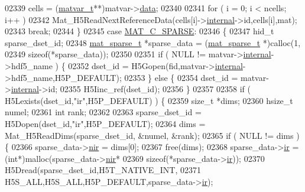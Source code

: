 \begin{DoxyCode}
{{{{{{{{{{02339             cells  = (\hyperlink{group___m_a_t_structmatvar__t}{matvar\_t}**)matvar->\hyperlink{group___m_a_t_a5672978efa230bbdecdf38ede781f7fa}{data};
02340 
02341             for ( i = 0; i < ncells; i++ )
02342                 Mat\_H5ReadNextReferenceData(cells[i]->\hyperlink{namespaceinternal}{internal}->id,cells[i],mat);
02343             \textcolor{keywordflow}{break};
02344         \}
02345         \textcolor{keywordflow}{case} \hyperlink{group___m_a_t_ggad4d60ae7b709fc81bfd744fb4c857c40a0d5655b7e6178a2242cb3bb56ff4c8d2}{MAT\_C\_SPARSE}:
02346         \{
02347             hid\_t sparse\_dset\_id;
02348             \hyperlink{group___m_a_t_structmat__sparse__t}{mat\_sparse\_t} *sparse\_data = (\hyperlink{group___m_a_t_structmat__sparse__t}{mat\_sparse\_t} *)calloc(1,
02349                 \textcolor{keyword}{sizeof}(*sparse\_data));
02350 
02351             \textcolor{keywordflow}{if} ( NULL != matvar->\hyperlink{group___m_a_t_a6e97e3ed9f40c49322c18561c2a94e92}{internal}->hdf5\_name ) \{
02352                 dset\_id = H5Gopen(fid,matvar->\hyperlink{group___m_a_t_a6e97e3ed9f40c49322c18561c2a94e92}{internal}->hdf5\_name,H5P\_DEFAULT);
02353             \} \textcolor{keywordflow}{else} \{
02354                 dset\_id = matvar->\hyperlink{group___m_a_t_a6e97e3ed9f40c49322c18561c2a94e92}{internal}->id;
02355                 H5Iinc\_ref(dset\_id);
02356             \}
02357 
02358             \textcolor{keywordflow}{if} ( H5Lexists(dset\_id,\textcolor{stringliteral}{"ir"},H5P\_DEFAULT) ) \{
02359                 \textcolor{keywordtype}{size\_t} *dims;
02360                 hsize\_t numel;
02361                 \textcolor{keywordtype}{int} rank;
02362 
02363                 sparse\_dset\_id = H5Dopen(dset\_id,\textcolor{stringliteral}{"ir"},H5P\_DEFAULT);
02364                 dims = Mat\_H5ReadDims(sparse\_dset\_id, &numel, &rank);
02365                 \textcolor{keywordflow}{if} ( NULL != dims ) \{
02366                     sparse\_data->\hyperlink{group___m_a_t_aa64636ad57cf87f7a28ff5018437a850}{nir} = dims[0];
02367                     free(dims);
02368                     sparse\_data->\hyperlink{group___m_a_t_a8d4c863d704edddec5cbfa15b2d719c8}{ir} = (\textcolor{keywordtype}{int}*)malloc(sparse\_data->\hyperlink{group___m_a_t_aa64636ad57cf87f7a28ff5018437a850}{nir}*
02369                                             \textcolor{keyword}{sizeof}(*sparse\_data->\hyperlink{group___m_a_t_a8d4c863d704edddec5cbfa15b2d719c8}{ir}));
02370                     H5Dread(sparse\_dset\_id,H5T\_NATIVE\_INT,
02371                             H5S\_ALL,H5S\_ALL,H5P\_DEFAULT,sparse\_data->\hyperlink{group___m_a_t_a8d4c863d704edddec5cbfa15b2d719c8}{ir});
}}}}}}}}}}
\end{DoxyCode}
